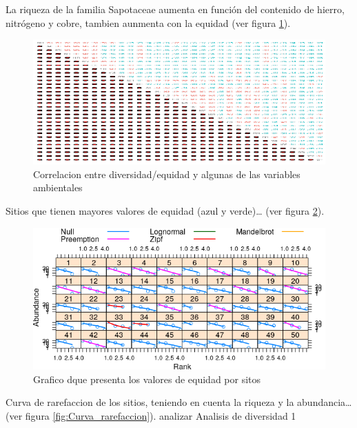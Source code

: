 \documentclass[11pt,]{article}
\begin{document}
{{La riqueza de la familia Sapotaceae aumenta en función del contenido de
hierro, nitrógeno y cobre, tambien aunmenta con la equidad (ver figura
\ref{fig:correlacion_diversidad_equidad}).

\begin{figure}
\centering
\includegraphics[width=1.00000\textwidth]{correlacion_diversidad_equidad.png}
\caption{Correlacion entre diversidad/equidad y algunas de las variables
ambientales \label{fig:correlacion_diversidad_equidad}}
\end{figure}

Sitios que tienen mayores valores de equidad (azul y verde)\ldots{} (ver
figura \ref{fig:grafico_niveles_equidad}).

\begin{figure}
\centering
\includegraphics{grafico_niveles_equidad.png}
\caption{Grafico dque presenta los valores de equidad por sitos
\label{fig:grafico_niveles_equidad}}
\end{figure}

Curva de rarefaccion de los sitios, teniendo en cuenta la riqueza y la
abundancia\ldots{}(ver figura \ref{fig:Curva_rarefaccion}). analizar
Analisis de diversidad 1

}}
\end{document}
